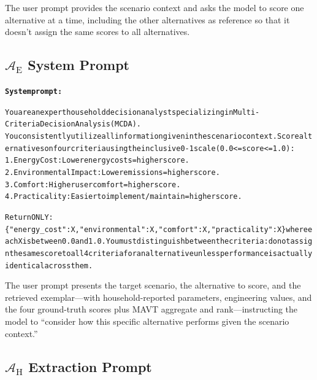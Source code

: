 \documentclass[final,3p,times]{elsarticle}
\begin{document}
\noindent The user prompt provides the scenario context and asks the model to score one alternative at a time, including the other alternatives as reference so that it doesn't assign the same scores to all alternatives.

\subsection{\texorpdfstring{$\mathcal{A}_{\text{E}}$}{A\_E} System Prompt}

\begin{minipage}{\columnwidth}
\begin{alltt}
\footnotesize
\textbf{System prompt:}

You are an expert household decision analyst specializing in Multi-Criteria Decision Analysis (MCDA).
You consistently utilize all information given in the scenario context. Score alternatives on four criteria using the inclusive 0-1 scale (0.0 <= score <= 1.0):
1. Energy Cost: Lower energy costs = higher score.
2. Environmental Impact: Lower emissions = higher score.
3. Comfort: Higher user comfort = higher score.
4. Practicality: Easier to implement/maintain = higher score.

Return ONLY: \{"energy\_cost": X, "environmental": X, "comfort": X, "practicality": X\} where each X is between 0.0 and 1.0. You must distinguish between the criteria: do not assign the same score to all 4 criteria for an alternative unless performance is actually identical across them.
\end{alltt}
\end{minipage}

\noindent The user prompt presents the target scenario, the alternative to score, and the retrieved exemplar---with household-reported parameters, engineering values, and the four ground-truth scores plus MAVT aggregate and rank---instructing the model to ``consider how this specific alternative performs given the scenario context.''

\subsection{\texorpdfstring{$\mathcal{A}_{\text{H}}$}{A\_H} Extraction Prompt}
\end{document}
